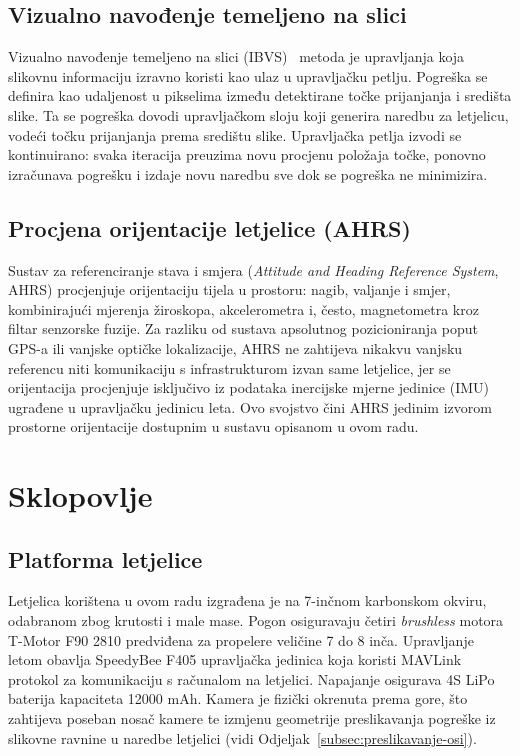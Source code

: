 \subsection{Vizualno navođenje temeljeno na slici}
\label{subsec:ibvs-teorija}
Vizualno navođenje temeljeno na slici (IBVS)~\cite{chaumette2006visual} metoda je upravljanja koja slikovnu informaciju izravno koristi kao ulaz u upravljačku petlju. Pogreška se definira kao udaljenost u pikselima između detektirane točke prijanjanja i središta slike. Ta se pogreška dovodi upravljačkom sloju koji generira naredbu za letjelicu, vodeći točku prijanjanja prema središtu slike. Upravljačka petlja izvodi se kontinuirano: svaka iteracija preuzima novu procjenu položaja točke, ponovno izračunava pogrešku i izdaje novu naredbu sve dok se pogreška ne minimizira.

\subsection{Procjena orijentacije letjelice (AHRS)}
Sustav za referenciranje stava i smjera (\emph{Attitude and Heading Reference System}, AHRS) procjenjuje orijentaciju tijela u prostoru: nagib, valjanje i smjer, kombinirajući mjerenja žiroskopa, akcelerometra i, često, magnetometra kroz filtar senzorske fuzije. Za razliku od sustava apsolutnog pozicioniranja poput GPS-a ili vanjske optičke lokalizacije, AHRS ne zahtijeva nikakvu vanjsku referencu niti komunikaciju s infrastrukturom izvan same letjelice, jer se orijentacija procjenjuje isključivo iz podataka inercijske mjerne jedinice (IMU) ugrađene u upravljačku jedinicu leta. Ovo svojstvo čini AHRS jedinim izvorom prostorne orijentacije dostupnim u sustavu opisanom u ovom radu.

\section{Sklopovlje}
\label{sec:sklopovlje}

\subsection{Platforma letjelice}
Letjelica korištena u ovom radu izgrađena je na 7-inčnom karbonskom okviru, odabranom zbog krutosti i male mase. Pogon osiguravaju četiri \emph{brushless} motora T-Motor F90 2810 predviđena za propelere veličine 7 do 8 inča. Upravljanje letom obavlja SpeedyBee F405 upravljačka jedinica koja koristi MAVLink protokol za komunikaciju s računalom na letjelici. Napajanje osigurava 4S LiPo baterija kapaciteta 12000 mAh. Kamera je fizički okrenuta prema gore, što zahtijeva poseban nosač kamere te izmjenu geometrije preslikavanja pogreške iz slikovne ravnine u naredbe letjelici (vidi Odjeljak~\ref{subsec:preslikavanje-osi}).

